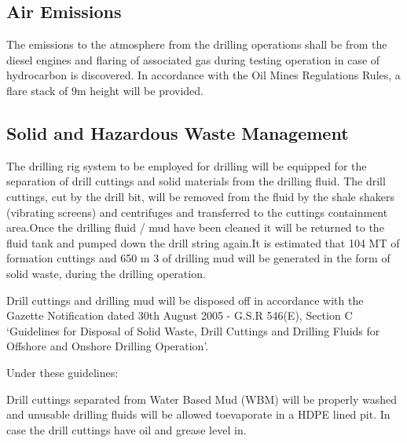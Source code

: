 \subsection{\textbf{Air Emissions}}

The emissions to the atmosphere from the drilling operations shall be from the diesel engines and flaring of associated gas during testing operation in case of hydrocarbon is discovered. In accordance with the Oil Mines Regulations Rules, a flare stack of 9m height will be provided.

\subsection{\textbf{Solid and Hazardous Waste Management}}

The drilling rig system to be employed for drilling will be equipped for the separation of drill cuttings and solid materials from the drilling fluid. The drill cuttings, cut by the drill bit, will be removed from the fluid by the shale shakers (vibrating screens) and centrifuges and transferred to the cuttings containment area.Once the drilling fluid / mud have been cleaned it will be returned to the fluid tank and pumped down the drill string again.It is estimated that 104 MT of formation cuttings and 650 m 3 of drilling mud will be generated in the form of solid waste, during the drilling operation.

Drill cuttings and drilling mud will be disposed off in accordance with the Gazette Notification dated 30th August 2005 - G.S.R 546(E), Section C ‘Guidelines for Disposal of Solid Waste, Drill Cuttings and Drilling Fluids for Offshore and Onshore Drilling
Operation’. 

Under these guidelines:

Drill cuttings separated from Water Based Mud (WBM) will be properly washed and unusable drilling fluids will be allowed toevaporate in a HDPE lined pit. In case the drill cuttings have oil and grease level in.

